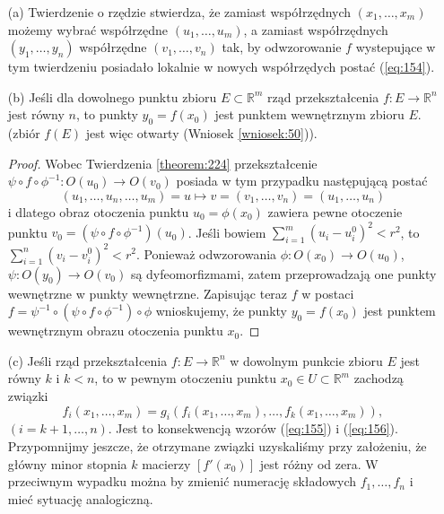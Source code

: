\documentclass[leqno]{article}
\begin{document}
\begin{justify}
\begin{uwaga}
    \begin{itemize}
        \item [(a)] Twierdzenie o rzędzie stwierdza, że zamiast współrzędnych $(x_1, \ldots, x_m)$ możemy wybrać współrzędne $(u_1, \ldots, u_m)$,
            a zamiast współrzędnych $(y_1, \ldots, y_n)$ współrzędne $(v_1, \ldots, v_n)$ tak, by odwzorowanie $f$ wystepujące w tym twierdzeniu posiadało lokalnie
            w nowych współrzędych postać (\ref{eq:154}).
        \item [(b)]
            Jeśli dla dowolnego punktu zbioru $E \subset \mathbb{R}^m$ rząd przekształcenia $f : E \to \mathbb{R}^n$ jest równy $n$,
            to punkty $y_0 = f(x_0)$ jest punktem wewnętrznym zbioru $E$. (zbiór $f(E)$ jest więc otwarty (Wniosek \ref{wniosek:50})). \\
            \begin{proof}
                Wobec Twierdzenia \ref{theorem:224} przekształcenie $\psi \circ f \circ \phi^{-1} : O(u_0) \to O(v_0)$ posiada w tym przypadku
                następującą postać 
                \[
                    (u_1, \ldots, u_n, \ldots, u_m) = u \mapsto v = (v_1, \ldots, v_n) = (u_1, \ldots, u_n)
                \]
                i dlatego obraz otoczenia punktu $u_0 = \phi(x_0)$ zawiera pewne otoczenie punktu $v_0 = (\psi \circ f \circ \phi^{-1})(u_0)$. Jeśli 
                bowiem $\sum_{i=1}^{m}{(u_i - u_i^0)}^2 < r^2$, to $\sum_{i=1}^{n}{(v_i - v_i^0)}^2 < r^2$. Ponieważ  
                odwzorowania $\phi : O(x_0) \to O(u_0)$, $\psi : O(y_0) \to O(v_0)$ są dyfeomorfizmami, zatem przeprowadzają
                one punkty wewnętrzne w punkty wewnętrzne. Zapisując teraz $f$ w postaci $f = \psi^{-1} \circ (\psi \circ f \circ \phi^{-1}) \circ \phi$ wnioskujemy, 
                że punkty $y_0 = f(x_0)$ jest punktem wewnętrznym obrazu otoczenia punktu $x_0$.
            \end{proof}
        \item [(c)]
            Jeśli rząd przekształcenia $f : E \to \mathbb{R}^n$ w dowolnym punkcie zbioru $E$ jest równy $k$ i $k < n$, to w pewnym otoczeniu punktu $x_0 \in U \subset \mathbb{R}^m$ zachodzą związki 
            \begin{equation}\label{eq:157}
                f_i(x_1, \ldots, x_m) = g_i(f_i(x_1, \ldots, x_m), \ldots, f_k(x_1, \ldots, x_m)),
            \end{equation}
            $(i = k +1, \ldots, n)$. Jest to konsekwencją wzorów (\ref{eq:155}) i (\ref{eq:156}). Przypomnijmy jeszcze, że otrzymane związki 
            uzyskaliśmy przy założeniu, że główny minor stopnia $k$ macierzy $[f'(x_0)]$ jest różny od zera. W przeciwnym wypadku 
            można by zmienić numerację składowych $f_1, \ldots, f_n$ i mieć sytuację analogiczną. 
    \end{itemize}
\end{uwaga}


\end{justify}
\end{document}
